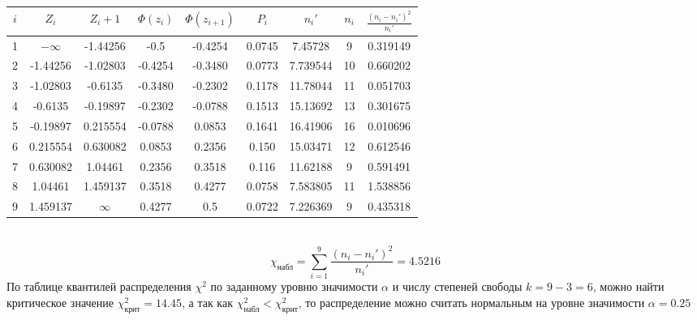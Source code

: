 \documentclass[12pt,a4paper]{report}
\begin{document}
\begin{tabular}{|c|c|c|c|c|c|c|c|c|}
	\hline
	$i$ & $Z_i$     & $Z_i + 1$ & $\Phi(z_{i})$ & $\Phi(z_{i + 1})$ & $P_i$  & $n_i'$   & $n_i$ & $\frac{(n_i-n_i')^2}{n_i'}$ \\
	\hline
	1   & $-\infty$ & -1.44256  & -0.5          & -0.4254           & 0.0745 & 7.45728  & 9     & 0.319149                    \\
	\hline
	2   & -1.44256  & -1.02803  & -0.4254       & -0.3480           & 0.0773 & 7.739544 & 10    & 0.660202                    \\
	\hline
	3   & -1.02803  & -0.6135   & -0.3480       & -0.2302           & 0.1178 & 11.78044 & 11    & 0.051703                    \\
	\hline
	4   & -0.6135   & -0.19897  & -0.2302       & -0.0788           & 0.1513 & 15.13692 & 13    & 0.301675                    \\
	\hline
	5   & -0.19897  & 0.215554  & -0.0788       & 0.0853            & 0.1641 & 16.41906 & 16    & 0.010696                    \\
	\hline
	6   & 0.215554  & 0.630082  & 0.0853        & 0.2356            & 0.150  & 15.03471 & 12    & 0.612546                    \\
	\hline
	7   & 0.630082  & 1.04461   & 0.2356        & 0.3518            & 0.116  & 11.62188 & 9     & 0.591491                    \\
	\hline
	8   & 1.04461   & 1.459137  & 0.3518        & 0.4277            & 0.0758 & 7.583805 & 11    & 1.538856                    \\
	\hline
	9   & 1.459137  & $\infty$  & 0.4277        & 0.5               & 0.0722 & 7.226369 & 9     & 0.435318                    \\
	\hline
\end{tabular}\\
\hfill\break
$$\chi_{\text{набл}}=\sum_{i=1}^9\frac{(n_i-n_i')^2}{n_i'}=4.5216$$
По таблице квантилей распределения $\chi^2$ по заданному уровню значимости $\alpha$ и числу степеней свободы $k=9-3=6$, можно найти критическое значение $\chi^2_\text{крит}=14.45$, а так как $\chi^2_\text{набл}<\chi^2_\text{крит}$, то распределение можно считать нормальным на уровне значимости $\alpha=0.25$
\end{document}
